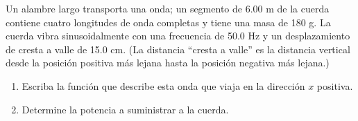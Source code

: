 \item Un alambre largo transporta una onda; un segmento de 6.00 m de la cuerda contiene cuatro longitudes de onda completas y tiene una masa de 180 g. La cuerda vibra sinusoidalmente con una frecuencia de 50.0 Hz y un desplazamiento de cresta a valle de 15.0 cm. (La distancia “cresta a valle” es la distancia vertical desde la posición positiva más lejana hasta la posición negativa más lejana.)
\begin{enumerate}
    \item Escriba la función que describe esta onda que viaja en la dirección $x$ positiva.
    \item Determine la potencia a suministrar a la cuerda.
\end{enumerate}